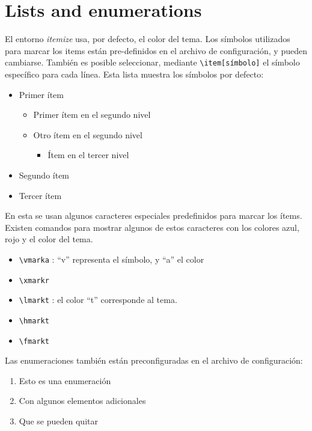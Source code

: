 \section{Lists and enumerations}

El entorno \textit{itemize} usa, por defecto, el color del tema. Los símbolos utilizados para marcar los items están pre-definidos en el archivo de configuración, y pueden cambiarse. También es posible seleccionar, mediante \verb+\item[símbolo]+ el símbolo específico para cada línea. Esta lista muestra los símbolos por defecto:

\begin{itemize}
\item Primer ítem
\begin{itemize}
\item Primer ítem en el segundo nivel
\item Otro ítem en el segundo nivel
\begin{itemize}
\item Ítem en el tercer nivel
\end{itemize}
\end{itemize}
\item Segundo ítem
\item Tercer ítem \\
\end{itemize}

En esta se usan algunos caracteres especiales predefinidos para marcar los ítems. Existen comandos para mostrar algunos de estos caracteres con los colores azul, rojo y el color del tema.

\begin{itemize}
\item[\vmarka] \verb+\vmarka+ : ``v'' representa el símbolo, y ``a'' el color
\item[\xmarkr] \verb+\xmarkr+
\item[\lmarkt] \verb+\lmarkt+ : el color ``t'' corresponde al tema.
\item[\hmarkt] \verb+\hmarkt+ 
\item[\fmarkt] \verb+\fmarkt+ \\
\end{itemize}

Las enumeraciones también están preconfiguradas en el archivo de configuración:

\begin{enumerate}
\item Esto es una enumeración
\item Con algunos elementos adicionales
\item Que se pueden quitar
\end{enumerate}

